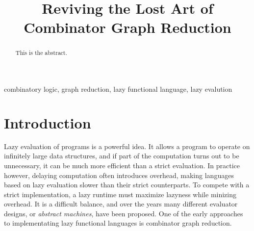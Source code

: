 \documentclass[conference]{IEEEtran}
\begin{document}
\title{Reviving the Lost Art of Combinator Graph Reduction}

\author{
}

\maketitle

\begin{abstract}
    This is the abstract.
\end{abstract}

\begin{IEEEkeywords}
    combinatory logic, graph reduction, lazy functional language, lazy evalution
\end{IEEEkeywords}

\section{Introduction}
Lazy evaluation of programs is a powerful idea.
It allows a program to operate on infinitely large data structures, and if part of the computation turns out to be unnecessary, it can be much more efficient than a strict evaluation.
In practice however, delaying computation often introduces overhead, making languages based on lazy evaluation slower than their strict counterparts.
To compete with a strict implementation, a lazy runtime must maximize lazyness while minizing overhead.
It is a difficult balance, and over the years many different evaluator designs, or \textit{abstract machines}, have been proposed\cite{kieburtz_g-machine_1985,fairbairn_tim_1987,burn_spineless_1988,koopman_fresh_1989,jones_implementing_nodate}.
One of the early approaches to implementating lazy functional languages is combinator graph reduction\cite{turner_new_1979}.
\end{document}
